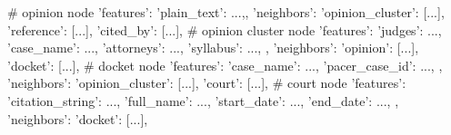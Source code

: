 \documentclass[11pt,UTF8,fontset=fandol]{ctexart}
\begin{document}
\begin{code}
# opinion node
{
    'features': {'plain_text': ...,},
    'neighbors': {
        'opinion_cluster': [...],
        'reference': [...],
        'cited_by': [...],
        }
}
# opinion cluster node
{
    'features': {
        'judges': ...,
        'case_name': ...,
        'attorneys': ...,
        'syllabus': ...,
        },
    'neighbors': {
        'opinion': [...],
        'docket': [...],
        }
}
# docket node
{
    'features': {
        'case_name': ...,
        'pacer_case_id': ...,
        },
    'neighbors': {
        'opinion_cluster': [...],
        'court': [...],
        }
}
# court node
{
    'features': {
        'citation_string': ...,
        'full_name': ...,
        'start_date': ...,
        'end_date': ...,
        },
    'neighbors': {
        'docket': [...],
        }
}
\end{code}
\end{document}
